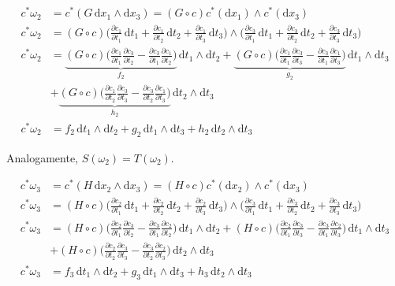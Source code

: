 \documentclass[12pt,a4paper]{article}
\begin{document}
		\begin{align}
			c^*\omega_2 &= c^*(G \,\mathrm{d}x_1 \wedge\mathrm{d}x_3) = (G \circ c) c^*(\mathrm{d}x_1) \wedge c^*(\mathrm{d}x_3) \\
			c^*\omega_2 &= (G \circ c) \biggl(\frac{\partial c_1}{\partial t_1} \,\mathrm{d}t_1 + \frac{\partial c_1}{\partial t_2} \,\mathrm{d}t_2 + \frac{\partial c_1}{\partial t_3} \,\mathrm{d}t_3 \biggl)  
				\wedge \biggl(\frac{\partial c_3}{\partial t_1} \,\mathrm{d}t_1 + \frac{\partial c_3}{\partial t_2} \,\mathrm{d}t_2 + \frac{\partial c_3}{\partial t_3} \,\mathrm{d}t_3 \biggl) \\
			c^*\omega_2 &= \underbrace{(G \circ c) \biggl(\frac{\partial c_1}{\partial t_1} \frac{\partial c_3}{\partial t_2} - \frac{\partial c_3}{\partial t_1} \frac{\partial c_1}{\partial t_2} \biggl)}_\text{$f_2$} \,\mathrm{d}t_1 \wedge \mathrm{d}t_2
				+ \underbrace{(G \circ c) \biggl(\frac{\partial c_1}{\partial t_1} \frac{\partial c_3}{\partial t_3} - \frac{\partial c_3}{\partial t_1} \frac{\partial c_1}{\partial t_3} \biggl)}_\text{$g_2$} \,\mathrm{d}t_1 \wedge \mathrm{d}t_3 \\
				&+ \underbrace{(G \circ c) \biggl(\frac{\partial c_1}{\partial t_2} \frac{\partial c_3}{\partial t_3} - \frac{\partial c_3}{\partial t_2} \frac{\partial c_1}{\partial t_3} \biggl)}_\text{$h_2$} \,\mathrm{d}t_2 \wedge \mathrm{d}t_3 \\
			c^*\omega_2 &= f_2 \,\mathrm{d}t_1 \wedge \mathrm{d}t_2 + g_2 \,\mathrm{d}t_1 \wedge \mathrm{d}t_3 + h_2 \,\mathrm{d}t_2 \wedge \mathrm{d}t_3 
		\end{align}
		
		Analogamente, $S(\omega_2) = T(\omega_2)$.
		
		\begin{align}
			c^*\omega_3 &= c^*(H \,\mathrm{d}x_2 \wedge\mathrm{d}x_3) = (H \circ c) c^*(\mathrm{d}x_2) \wedge c^*(\mathrm{d}x_3) \\
			c^*\omega_3 &= (H \circ c) \biggl(\frac{\partial c_2}{\partial t_1} \,\mathrm{d}t_1 + \frac{\partial c_2}{\partial t_2} \,\mathrm{d}t_2 + \frac{\partial c_2}{\partial t_3} \,\mathrm{d}t_3 \biggl)  
				\wedge \biggl(\frac{\partial c_3}{\partial t_1} \,\mathrm{d}t_1 + \frac{\partial c_3}{\partial t_2} \,\mathrm{d}t_2 + \frac{\partial c_3}{\partial t_3} \,\mathrm{d}t_3 \biggl) \\
			c^*\omega_3 &= (H \circ c) \biggl(\frac{\partial c_2}{\partial t_1} \frac{\partial c_3}{\partial t_2} - \frac{\partial c_3}{\partial t_1} \frac{\partial c_2}{\partial t_2} \biggl) \,\mathrm{d}t_1 \wedge \mathrm{d}t_2
				+ (H \circ c) \biggl(\frac{\partial c_2}{\partial t_1} \frac{\partial c_3}{\partial t_3} - \frac{\partial c_3}{\partial t_1} \frac{\partial c_2}{\partial t_3} \biggl) \,\mathrm{d}t_1 \wedge \mathrm{d}t_3 \\
				&+ (H \circ c) \biggl(\frac{\partial c_2}{\partial t_2} \frac{\partial c_3}{\partial t_3} - \frac{\partial c_3}{\partial t_2} \frac{\partial c_2}{\partial t_3} \biggl) \,\mathrm{d}t_2 \wedge \mathrm{d}t_3 \\
			c^*\omega_3 &= f_3 \,\mathrm{d}t_1 \wedge \mathrm{d}t_2 + g_3 \,\mathrm{d}t_1 \wedge \mathrm{d}t_3 + h_3 \,\mathrm{d}t_2 \wedge \mathrm{d}t_3 
		\end{align}		
		
\end{document}
